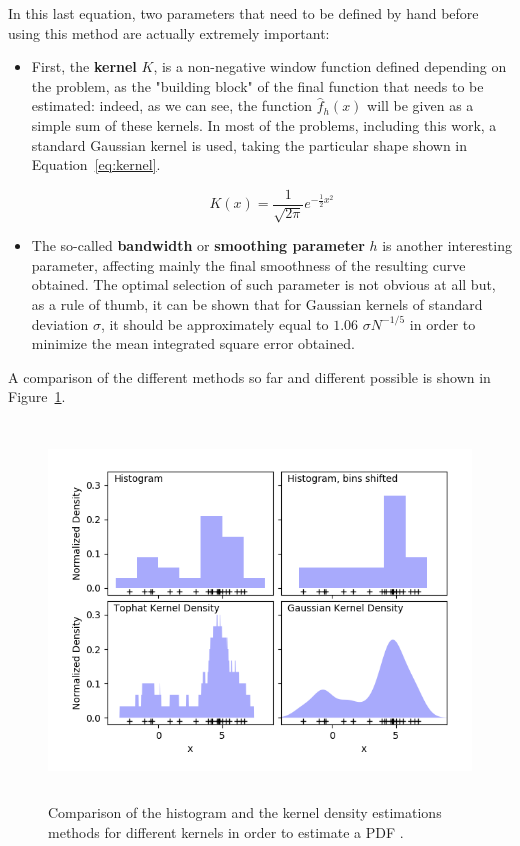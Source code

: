 \documentclass[a4paper, 11pt]{report}
\begin{document}
In this last equation, two parameters that need to be defined by hand before using this method are actually extremely important:
\begin{itemize}
\item First, the \textbf{kernel} $K$, is a non-negative window function defined depending on the problem, as the "building block" of the final function that needs to be estimated: indeed, as we can see, the function $\hat{f}_h(x)$ will be given as a simple sum of these kernels. In most of the problems, including this work, a standard Gaussian kernel is used, taking the particular shape shown in Equation~\ref{eq:kernel}.

\begin{equation}
\label{eq:kernel}
K(x) = \frac{1}{\sqrt{2 \pi}} e^{-\frac{1}{2} x^2}
\end{equation}

\item The so-called \textbf{bandwidth} or \textbf{smoothing parameter} $h$ is another interesting parameter, affecting mainly the final smoothness of the resulting curve obtained. The optimal selection of such parameter is not obvious at all \cite{bandwidth} but, as a rule of thumb, it can be shown that for Gaussian kernels of standard deviation $\sigma$, it should be approximately equal to $1.06$ $\sigma N^{-1/5}$ in order to minimize the mean integrated square error obtained. 
\end{itemize}

A comparison of the different methods so far and different possible is shown in Figure~\ref{fig:KGR}.

\begin{figure}[htbp]
\centering
\includegraphics[width=13cm, height=10cm]{figs/kernels.png}
\caption{Comparison of the histogram and the kernel density estimations methods for different kernels in order to estimate a PDF \cite{scikit}.}
\label{fig:KGR}
\end{figure}
\end{document}
